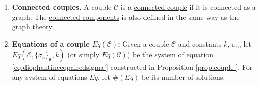\begin{defn}\label{def.morecouple}
\begin{enumerate}
 \item \textbf{Connected couples.} A couple $\mathcal{C}$ is a \underline{connected couple} if it is connected as a graph. The \underline{connected components} is also defined in the same way as the graph theory. 
 \item \textbf{Equations of a couple $Eq(\mathcal{C})$:} Given a couple $\mathcal{C}$ and constants $k$, $\sigma_{\mathfrak{n}}$, let $Eq(\mathcal{C},\{\sigma_{\mathfrak{n}}\}_{\mathfrak{n}}, k)$ (or simply $Eq(\mathcal{C})$) be the system of equation \eqref{eq.diophantineeqpairedsigma'} constructed in Proposition \ref{prop.couple'}. For any system of equations $Eq$, let $\#(Eq)$ be its number of solutions.
\end{enumerate}
\end{defn}

